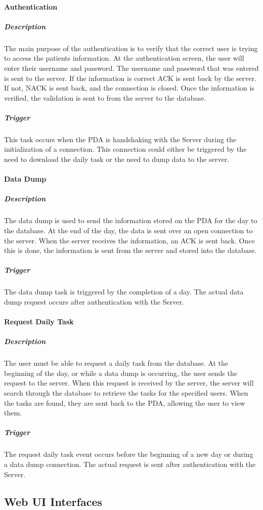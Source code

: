 \documentclass{article}
\begin{document}
\paragraph{Authentication}
\subparagraph{Description}
The main purpose of the authentication is to verify that the correct user is trying to access the patients information. At the authentication screen, the user will enter their username and password. The username and password that was entered is sent to the server. If the information is correct ACK is sent back by the server. If not, NACK is sent back, and the connection is closed. Once the information is verified, the validation is sent to from the server to the database. 
\subparagraph{Trigger}
This task occurs when the PDA is handshaking with the Server during the initialization of a connection. This connection could either be triggered by the need to download the daily task or the need to dump data to the server.

\paragraph{Data Dump}
\subparagraph{Description} 
The data dump is used to send the information stored on the PDA for the day to the database. At the end of the day, the data is sent over an open connection to the server. When the server receives the information, an ACK is sent back. Once this is done, the information is sent from the server and stored into the database. 
\subparagraph{Trigger}
The data dump task is triggered by the completion of a day. The actual data dump request occurs after authentication with the Server.

\paragraph{Request Daily Task}
\subparagraph{Description}
The user must be able to request a daily task from the database. At the beginning of the day, or while a data dump is occurring, the user sends the request to the server. When this request is received by the server, the server will search through the database to retrieve the tasks for the specified users. When the tasks are found, they are sent back to the PDA, allowing the user to view them. 
\subparagraph{Trigger}
The request daily task event occurs before the beginning of a new day or during a data dump connection. The actual request is sent after authentication with the Server.

\subsection{Web UI Interfaces}
\end{document}

